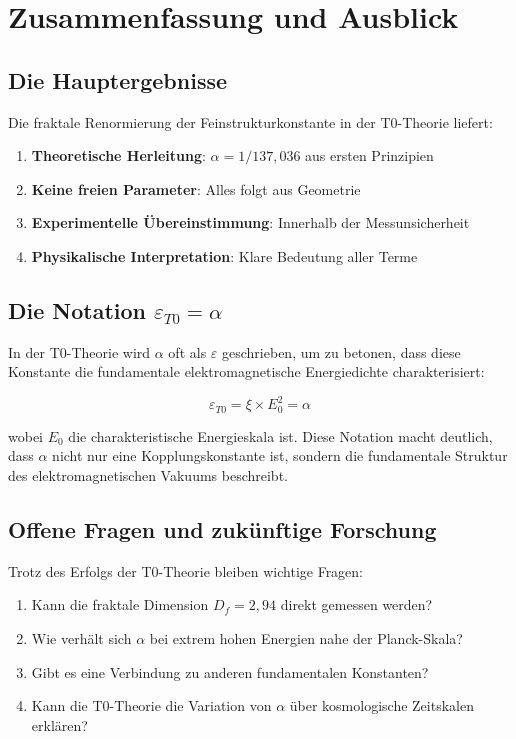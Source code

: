 \documentclass[12pt,a4paper]{article}
\theoremstyle{definition}
\begin{document}
	\section{Zusammenfassung und Ausblick}
	
	\subsection{Die Hauptergebnisse}
	
	Die fraktale Renormierung der Feinstrukturkonstante in der T0-Theorie liefert:
	
	\begin{enumerate}
		\item \textbf{Theoretische Herleitung}: $\alpha = 1/137{,}036$ aus ersten Prinzipien
		\item \textbf{Keine freien Parameter}: Alles folgt aus Geometrie
		\item \textbf{Experimentelle Übereinstimmung}: Innerhalb der Messunsicherheit
		\item \textbf{Physikalische Interpretation}: Klare Bedeutung aller Terme
	\end{enumerate}
	
	\subsection{Die Notation $\varepsilon_{T0} = \alpha$}
	
	In der T0-Theorie wird $\alpha$ oft als $\varepsilon$ geschrieben, um zu betonen, dass diese Konstante die fundamentale elektromagnetische Energiedichte charakterisiert:
	
	\begin{equation}
		\varepsilon_{T0} = \xi \times E_0^2 = \alpha
	\end{equation}
	
	wobei $E_0$ die charakteristische Energieskala ist. Diese Notation macht deutlich, dass $\alpha$ nicht nur eine Kopplungskonstante ist, sondern die fundamentale Struktur des elektromagnetischen Vakuums beschreibt.
	
	\subsection{Offene Fragen und zukünftige Forschung}
	
	Trotz des Erfolgs der T0-Theorie bleiben wichtige Fragen:
	
	\begin{enumerate}
		\item Kann die fraktale Dimension $D_f = 2{,}94$ direkt gemessen werden?
		\item Wie verhält sich $\alpha$ bei extrem hohen Energien nahe der Planck-Skala?
		\item Gibt es eine Verbindung zu anderen fundamentalen Konstanten?
		\item Kann die T0-Theorie die Variation von $\alpha$ über kosmologische Zeitskalen erklären?
	\end{enumerate}
	
\end{document}
